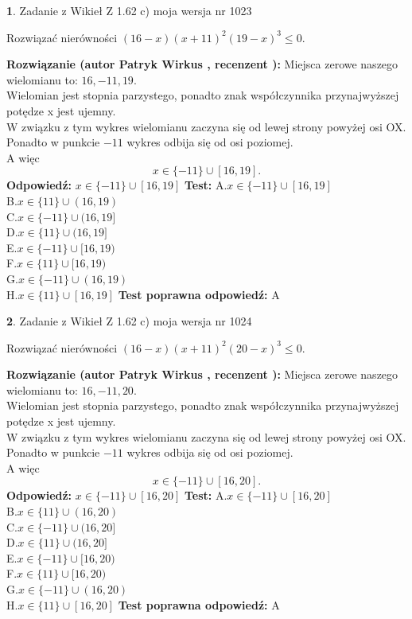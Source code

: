 \documentclass[12pt, a4paper]{article}
\theoremstyle{definition} %
\newtheorem{zad}{}
\newcommand{\zadStart}[1]{\begin{zad}#1\newline}
\newcommand{\zadStop}{\end{zad}}
\newcommand{\rozwStart}[2]{\noindent \textbf{Rozwiązanie (autor #1 , recenzent #2): }\newline}
\newcommand{\rozwStop}{\newline}
\newcommand{\odpStart}{\noindent \textbf{Odpowiedź:}\newline}
\newcommand{\odpStop}{\newline}
\newcommand{\testStart}{\noindent \textbf{Test:}\newline}
\newcommand{\testStop}{\newline}
\newcommand{\kluczStart}{\noindent \textbf{Test poprawna odpowiedź:}\newline}
\newcommand{\kluczStop}{\newline}
\begin{document}
\zadStart{Zadanie z Wikieł Z 1.62 c) moja wersja nr 1023}

Rozwiązać nierówności $(16-x)(x+11)^{2}(19-x)^{3}\le0$.
\zadStop
\rozwStart{Patryk Wirkus}{}
Miejsca zerowe naszego wielomianu to: $16, -11, 19$.\\
Wielomian jest stopnia parzystego, ponadto znak współczynnika przy\linebreak najwyższej potędze x jest ujemny.\\ W związku z tym wykres wielomianu zaczyna się od lewej strony powyżej osi OX.\\
Ponadto w punkcie $-11$ wykres odbija się od osi poziomej.\\
A więc $$x \in \{-11\} \cup [16,19].$$
\rozwStop
\odpStart
$x \in \{-11\} \cup [16,19]$
\odpStop
\testStart
A.$x \in \{-11\} \cup [16,19]$\\
B.$x \in \{11\} \cup (16,19)$\\
C.$x \in \{-11\} \cup (16,19]$\\
D.$x \in \{11\} \cup (16,19]$\\
E.$x \in \{-11\} \cup [16,19)$\\
F.$x \in \{11\} \cup [16,19)$\\
G.$x \in \{-11\} \cup (16,19)$\\
H.$x \in \{11\} \cup [16,19]$
\testStop
\kluczStart
A
\kluczStop



\zadStart{Zadanie z Wikieł Z 1.62 c) moja wersja nr 1024}

Rozwiązać nierówności $(16-x)(x+11)^{2}(20-x)^{3}\le0$.
\zadStop
\rozwStart{Patryk Wirkus}{}
Miejsca zerowe naszego wielomianu to: $16, -11, 20$.\\
Wielomian jest stopnia parzystego, ponadto znak współczynnika przy\linebreak najwyższej potędze x jest ujemny.\\ W związku z tym wykres wielomianu zaczyna się od lewej strony powyżej osi OX.\\
Ponadto w punkcie $-11$ wykres odbija się od osi poziomej.\\
A więc $$x \in \{-11\} \cup [16,20].$$
\rozwStop
\odpStart
$x \in \{-11\} \cup [16,20]$
\odpStop
\testStart
A.$x \in \{-11\} \cup [16,20]$\\
B.$x \in \{11\} \cup (16,20)$\\
C.$x \in \{-11\} \cup (16,20]$\\
D.$x \in \{11\} \cup (16,20]$\\
E.$x \in \{-11\} \cup [16,20)$\\
F.$x \in \{11\} \cup [16,20)$\\
G.$x \in \{-11\} \cup (16,20)$\\
H.$x \in \{11\} \cup [16,20]$
\testStop
\kluczStart
A
\kluczStop
\end{document}
